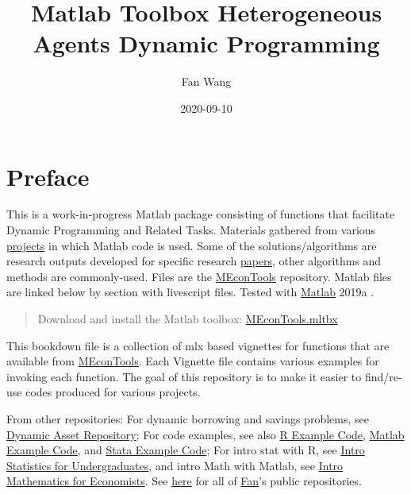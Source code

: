 \documentclass[
]{book}
\title{Matlab Toolbox Heterogeneous Agents Dynamic Programming}
\author{Fan Wang}
\date{2020-09-10}
\begin{document}
\maketitle

{
\hypersetup{linkcolor=}
\setcounter{tocdepth}{1}
\tableofcontents
}
\hypertarget{preface}{%
\chapter*{Preface}\label{preface}}

This is a work-in-progress Matlab package consisting of functions that facilitate Dynamic Programming and Related Tasks. Materials gathered from various \href{https://fanwangecon.github.io/research}{projects} in which Matlab code is used. Some of the solutions/algorithms are research outputs developed for specific research \href{https://fanwangecon.github.io/research}{papers}, other algorithms and methods are commonly-used. Files are the \href{https://github.com/FanWangEcon/MEconTools}{MEconTools} repository. Matlab files are linked below by section with livescript files. Tested with \href{https://www.mathworks.com/products/matlab.html}{Matlab} 2019a \citep{matlab}.

\begin{quote}
Download and install the Matlab toolbox: \href{https://github.com/FanWangEcon/MEconTools/blob/master/MEconTools.mltbx}{MEconTools.mltbx}
\end{quote}

This bookdown file is a collection of mlx based vignettes for functions that are available from \href{https://github.com/FanWangEcon/MEconTools}{MEconTools}. Each Vignette file contains various examples for invoking each function. The goal of this repository is to make it easier to find/re-use codes produced for various projects.

From other repositories: For dynamic borrowing and savings problems, see \href{https://fanwangecon.github.io/CodeDynaAsset/}{Dynamic Asset Repository}; For code examples, see also \href{https://fanwangecon.github.io/R4Econ/}{R Example Code}, \href{https://fanwangecon.github.io/M4Econ/}{Matlab Example Code}, and \href{https://fanwangecon.github.io/Stata4Econ/}{Stata Example Code}; For intro stat with R, see \href{https://fanwangecon.github.io/Stat4Econ/}{Intro Statistics for Undergraduates}, and intro Math with Matlab, see \href{https://fanwangecon.github.io/Math4Econ/}{Intro Mathematics for Economists}. See \href{https://github.com/FanWangEcon}{here} for all of \href{https://fanwangecon.github.io/}{Fan}'s public repositories.
\end{document}
